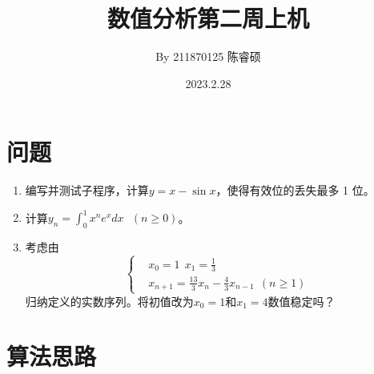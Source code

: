 \documentclass[a4paper,11pt,openany,notitlepage]{book}
\title{\vspace{-1.5cm} \textbf{\huge{数值分析第二周上机}}\vspace{-1em}}
\author{By 211870125 陈睿硕}
\date{\vspace{-0.5cm}2023.2.28}
\begin{document}
\maketitle
\vspace{-1cm}
\thispagestyle{fancy}

\section{问题}
\begin{enumerate}
    \item 编写并测试子程序，计算$y = x - \sin{x}$，使得有效位的丢失最多 1 位。 \label{1}\notag
    \item 计算$y_{n} = \int_{0}^{1} x^{n} e^{x} dx\ \ \ (n \geq 0)$。 \label{2}\notag
    \item 考虑由
    \begin{equation*}
        \left\{
        \begin{aligned}
        & x_{0}=1\ \ x_{1}=\frac{1}{3}\\
        & x_{n+1}=\frac{13}{3}x_{n}-\frac{4}{3}x_{n-1}\ \ (n\geq1)
        \end{aligned}
        \right.
        \end{equation*}
    归纳定义的实数序列。将初值改为$x_{0}=1$和$x_{1}=4$数值稳定吗？ \label{3}\notag
\end{enumerate}

\section{算法思路}
\end{document}
